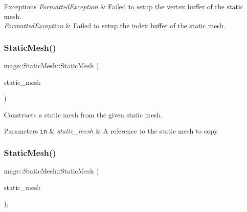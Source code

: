 \begin{DoxyExceptions}{Exceptions}
{\em \hyperlink{classmage_1_1_formatted_exception}{Formatted\+Exception}} & Failed to setup the vertex buffer of the static mesh. \\
\hline
{\em \hyperlink{classmage_1_1_formatted_exception}{Formatted\+Exception}} & Failed to setup the index buffer of the static mesh. \\
\hline
\end{DoxyExceptions}
\hypertarget{classmage_1_1_static_mesh_a15be69ad312c252c9816a57ec1555d73}{}\label{classmage_1_1_static_mesh_a15be69ad312c252c9816a57ec1555d73} 
\subsubsection{\texorpdfstring{Static\+Mesh()}{StaticMesh()}\hspace{0.1cm}{\footnotesize\ttfamily [5/6]}}
{\footnotesize\ttfamily mage\+::\+Static\+Mesh\+::\+Static\+Mesh (\begin{DoxyParamCaption}\item[{const \hyperlink{classmage_1_1_static_mesh}{Static\+Mesh} \&}]{static\+\_\+mesh }\end{DoxyParamCaption})\hspace{0.3cm}{\ttfamily [delete]}}

Constructs a static mesh from the given static mesh.


\begin{DoxyParams}[1]{Parameters}
\mbox{\tt in}  & {\em static\+\_\+mesh} & A reference to the static mesh to copy. \\
\hline
\end{DoxyParams}
\hypertarget{classmage_1_1_static_mesh_a8d2238338c9bc450e2aaaf79ada0634e}{}\label{classmage_1_1_static_mesh_a8d2238338c9bc450e2aaaf79ada0634e} 
\subsubsection{\texorpdfstring{Static\+Mesh()}{StaticMesh()}\hspace{0.1cm}{\footnotesize\ttfamily [6/6]}}
{\footnotesize\ttfamily mage\+::\+Static\+Mesh\+::\+Static\+Mesh (\begin{DoxyParamCaption}\item[{\hyperlink{classmage_1_1_static_mesh}{Static\+Mesh} \&\&}]{static\+\_\+mesh }\end{DoxyParamCaption})\hspace{0.3cm}{\ttfamily [default]}, {\ttfamily [noexcept]}}

